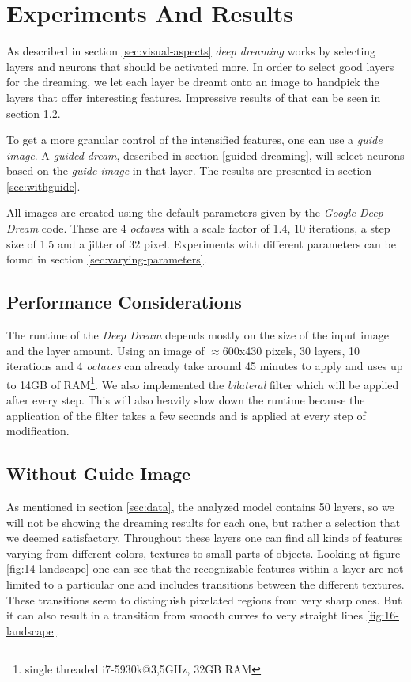 \section{Experiments And Results}
\label{sec:evaluation}
As described in section \ref{sec:visual-aspects} \emph{deep dreaming} works by selecting layers and neurons that should be activated more.
In order to select good layers for the dreaming, we let each layer be dreamt onto an image to handpick the layers that offer interesting features.
Impressive results of that can be seen in section \ref{sec:withoutguide}.

To get a more granular control of the intensified features, one can use a \textit{guide image}.
A \textit{guided dream}, described in section \ref{guided-dreaming}, will select neurons based on the \textit{guide image} in that layer.
The results are presented in section \ref{sec:withguide}.

All images are created using the default parameters given by the \textit{Google Deep Dream} code.
These are 4 \textit{octaves} with a scale factor of 1.4, 10 iterations, a step size of 1.5 and a jitter of 32 pixel.
Experiments with different parameters can be found in section \ref{sec:varying-parameters}.


\subsection{Performance Considerations}
\label{sec:performance}
The runtime of the \textit{Deep Dream} depends mostly on the size of the input image and the layer amount.
Using an image of $\approx$600x430 pixels, 30 layers, 10 iterations and 4 \textit{octaves} can already take around 45 minutes to apply and uses up to 14GB of RAM\footnote{single threaded i7-5930k@3,5GHz, 32GB RAM}.
We also implemented the \textit{bilateral} filter which will be applied after every step.\cite{bilateral}
This will also heavily slow down the runtime because the application of the filter takes a few seconds and is applied at every step of modification.


\subsection{Without Guide Image}
\label{sec:withoutguide}

As mentioned in section \ref{sec:data}, the analyzed model contains 50 layers, so we will not be showing the dreaming results for each one, but rather a selection that we deemed satisfactory.
Throughout these layers one can find all kinds of features varying from different colors, textures to small parts of objects.
Looking at figure \ref{fig:14-landscape} one can see that the recognizable features within a layer are not limited to a particular one and includes transitions between the different textures.
These transitions seem to distinguish pixelated regions from very sharp ones.
But it can also result in a transition from smooth curves to very straight lines \ref{fig:16-landscape}.

